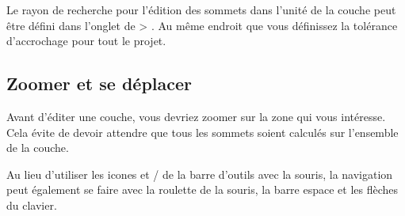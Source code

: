 Le rayon de recherche pour l'édition des sommets dans l'unité de la couche peut être défini dans l'onglet  de  > . Au même endroit que vous définissez la tolérance d'accrochage pour tout le projet.

\subsection{Zoomer et se déplacer}


Avant d'éditer une couche, vous devriez zoomer sur la zone qui vous intéresse. Cela évite de devoir attendre que tous les sommets soient calculés sur l'ensemble de la couche.


Au lieu d'utiliser les icones  et / de la barre d'outils avec la souris, la navigation peut également se faire avec la roulette de la souris, la barre espace et les flèches du clavier.



